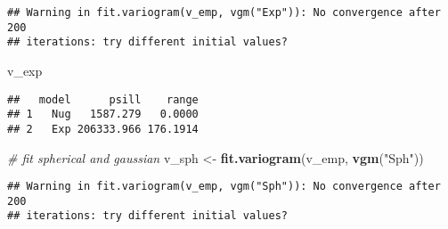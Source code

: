 \documentclass[]{book}
\newenvironment{Shaded}{\begin{snugshade}}{\end{snugshade}}
\newcommand{\CommentTok}[1]{\textcolor[rgb]{0.56,0.35,0.01}{\textit{#1}}}
\newcommand{\KeywordTok}[1]{\textcolor[rgb]{0.13,0.29,0.53}{\textbf{#1}}}
\newcommand{\NormalTok}[1]{#1}
\newcommand{\StringTok}[1]{\textcolor[rgb]{0.31,0.60,0.02}{#1}}
\begin{document}
\begin{verbatim}
## Warning in fit.variogram(v_emp, vgm("Exp")): No convergence after 200
## iterations: try different initial values?
\end{verbatim}

\begin{Shaded}
\begin{Highlighting}[]
\NormalTok{v_exp}
\end{Highlighting}
\end{Shaded}

\begin{verbatim}
##   model      psill    range
## 1   Nug   1587.279   0.0000
## 2   Exp 206333.966 176.1914
\end{verbatim}

\begin{Shaded}
\begin{Highlighting}[]
\CommentTok{# fit spherical and gaussian}
\NormalTok{v_sph <-}\StringTok{ }\KeywordTok{fit.variogram}\NormalTok{(v_emp, }\KeywordTok{vgm}\NormalTok{(}\StringTok{"Sph"}\NormalTok{))}
\end{Highlighting}
\end{Shaded}

\begin{verbatim}
## Warning in fit.variogram(v_emp, vgm("Sph")): No convergence after 200
## iterations: try different initial values?
\end{verbatim}
\end{document}
